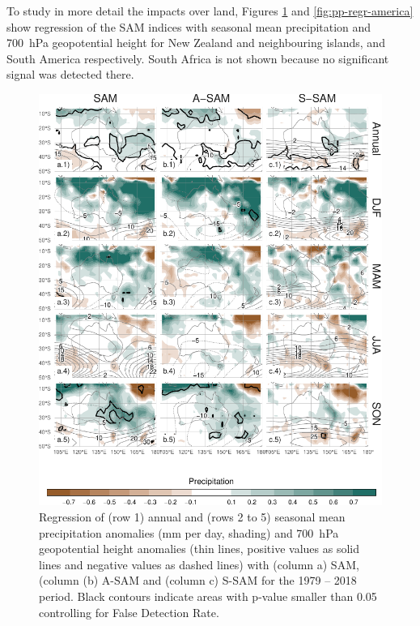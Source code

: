 \documentclass[smallextended]{svjour3}       %
\begin{document}
To study in more detail the impacts over land, Figures \ref{fig:pp-regr-oceania} and \ref{fig:pp-regr-america} show regression of the SAM indices with seasonal mean precipitation and 700~hPa geopotential height for New Zealand and neighbouring islands, and South America respectively.
South Africa is not shown because no significant signal was detected there.

\begin{figure}
\includegraphics{pp-regr-oceania-1} \caption{Regression of (row 1) annual and (rows 2 to 5) seasonal mean precipitation anomalies (mm per day, shading) and 700~hPa geopotential height anomalies (thin lines, positive values as solid lines and negative values as dashed lines) with (column a) SAM, (column (b) A\nobreakdash-SAM and (column c) S\nobreakdash-SAM for the 1979 -- 2018 period. Black contours indicate areas with p-value smaller than 0.05 controlling for False Detection Rate.}\label{fig:pp-regr-oceania}
\end{figure}
\end{document}
